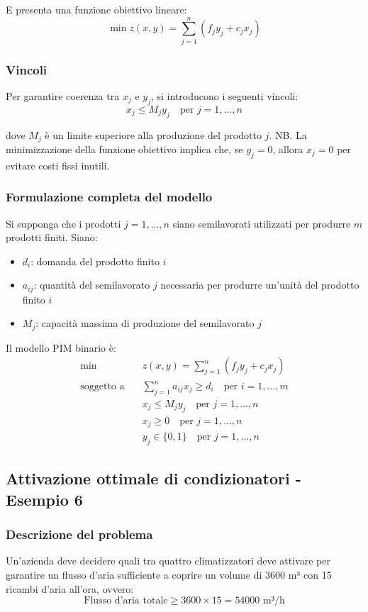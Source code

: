 E presenta una funzione obiettivo lineare:
\[
\min z(x, y) = \sum_{j=1}^{n} (f_j y_j + c_j x_j)
\]

\subsubsection{Vincoli}
Per garantire coerenza tra $x_j$ e $y_j$, si introducono i seguenti vincoli:
\[
x_j \leq M_j y_j \quad \text{per } j = 1, \dots, n
\]

dove $M_j$ è un limite superiore alla produzione del prodotto $j$.
NB. La minimizzazione della funzione obiettivo implica che, se $y_j = 0$, allora $x_j = 0$ 
per evitare costi fissi inutili.

\subsubsection{Formulazione completa del modello}
Si supponga che i prodotti $j=1, \ldots, n$ siano semilavorati utilizzati per produrre 
$m$ prodotti finiti. Siano:
\begin{itemize}
    \item $d_i$: domanda del prodotto finito $i$
    \item $a_{ij}$: quantità del semilavorato $j$ necessaria per produrre un'unità del prodotto finito $i$
    \item $M_j$: capacità massima di produzione del semilavorato $j$
\end{itemize}

Il modello PIM binario è:
\[
\begin{aligned}
\min \quad & z(x, y) = \sum_{j=1}^{n} (f_j y_j + c_j x_j) \\
\text{soggetto a} \quad & \sum_{j=1}^{n} a_{ij} x_j \geq d_i \quad \text{per } i = 1, \dots, m \\
& x_j \leq M_j y_j \quad \text{per } j = 1, \dots, n \\
& x_j \geq 0 \quad \text{per } j = 1, \dots, n \\
& y_j \in \{0, 1\} \quad \text{per } j = 1, \dots, n
\end{aligned}
\]

\subsection{Attivazione ottimale di condizionatori - Esempio 6}
\subsubsection{Descrizione del problema}
Un'azienda deve decidere quali tra quattro climatizzatori deve attivare 
per garantire un flusso d'aria sufficiente a coprire un volume di 3600 m³ con 
15 ricambi d'aria all'ora, ovvero:
\[
\text{Flusso d'aria totale} \geq 3600 \times 15 = 54000 \text{ m³/h}
\]


